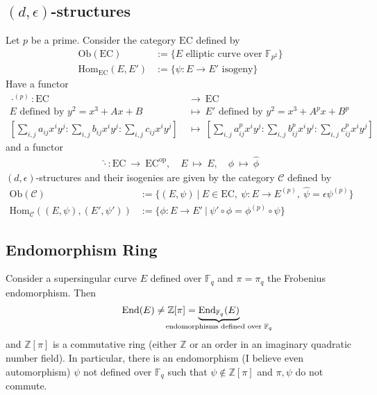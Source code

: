\documentclass{scrartcl}
\newcommand{\Z}{\mathbb{Z}}
\newcommand{\F}{\mathbb{F}}
\theoremstyle{definition}
\begin{document}
\subsection*{$(d, \epsilon)$-structures}
Let $p$ be a prime.
Consider the category $\mathrm{EC}$ defined by
\begin{align*}
    \mathrm{Ob}(\mathrm{EC}) &:= \{ \text{$E$ elliptic curve over $\F_{p^2}$} \} \\
    \mathrm{Hom}_{\mathrm{EC}}(E, E') &:= \{ \text{$\psi: E \to E'$ isogeny} \}
\end{align*}
Have a functor
\begin{align*}
    \cdot^{(p)}: \mathrm{EC} \ &\to \ \mathrm{EC} \\
    \text{$E$ defined by $y^2 = x^3 + Ax + B$} \ &\mapsto \ \text{$E'$ defined by $y^2 = x^3 + A^p x + B^p$} \\
    \left[ \sum_{i, j} a_{ij} x^i y^j : \sum_{i, j} b_{ij} x^i y^j : \sum_{i, j} c_{ij} x^i y^j \right] \ &\mapsto \ \left[ \sum_{i, j} a_{ij}^p x^i y^j : \sum_{i, j} b_{ij}^p x^i y^j : \sum_{i, j} c_{ij}^p x^i y^j \right]
\end{align*}
and a functor
\begin{align*}
    \hat{\cdot}: \mathrm{EC} \ \to \ \mathrm{EC}^{\mathrm{op}}, \quad E \ \mapsto \ E, \quad \phi \ \mapsto \ \hat{\phi}
\end{align*}
$(d, \epsilon)$-structures and their isogenies are given by the category $\mathcal{C}$ defined by
\begin{align*}
    \mathrm{Ob}(\mathcal{C}) &:= \{ (E, \psi) \ | \ E \in \mathrm{EC}, \ \psi: E \to E^{(p)}, \ \hat{\psi} = \epsilon\psi^{(p)} \} \\
    \mathrm{Hom}_{\mathcal{C}}((E, \psi), (E', \psi')) &:= \{ \phi: E \to E' \ | \ \psi' \circ \phi = \phi^{(p)} \circ \psi \}
\end{align*}

\subsection*{Endomorphism Ring}
Consider a supersingular curve $E$ defined over $\F_q$ and $\pi = \pi_q$ the Frobenius endomorphism.
Then
\begin{equation*}
    \mathrm{End}(E) \neq \Z[\pi] = \underbrace{\mathrm{End}_{\F_q}(E)}_{\mathclap{\text{endomorphisms defined over $\F_q$}}}
\end{equation*}
and $\Z[\pi]$ is a commutative ring (either $\Z$ or an order in an imaginary quadratic number field).
In particular, there is an endomorphism (I believe even automorphism) $\psi$ not defined over $\F_q$ such that $\psi \notin \Z[\pi]$ and $\pi, \psi$ do not commute.
\end{document}
